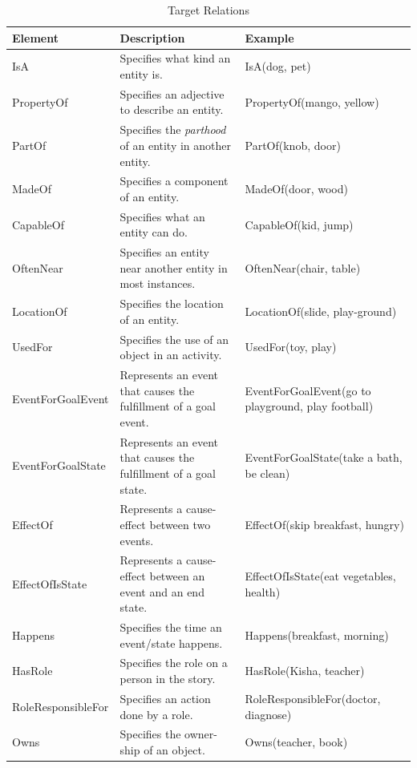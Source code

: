 \begin{table}[H]   %
\centering
\caption{Target Relations} \vspace{0.25em}
\begin{tabular}{|p{3.5cm}|p{4cm}|p{5.5cm}|} \hline
\textbf{Element} & \textbf{Description} & \textbf{Example} \\ \hline
IsA					& Specifies what kind an entity is. & IsA(dog, pet) \\ \hline
PropertyOf			& Specifies an adjective to describe an entity. & PropertyOf(mango, yellow) \\ \hline
PartOf				& Specifies the \textit{parthood} of an entity in another entity. & PartOf(knob, door) \\ \hline
MadeOf				& Specifies a component of an entity. & MadeOf(door, wood) \\ \hline
CapableOf			& Specifies what an entity can do. & CapableOf(kid, jump) \\ \hline
OftenNear			& Specifies an entity near another entity in most instances. & OftenNear(chair, table) \\ \hline
LocationOf			& Specifies the location of an entity. & LocationOf(slide, play-ground) \\ \hline
UsedFor				& Specifies the use of an object in an activity. & UsedFor(toy, play) \\ \hline
EventForGoalEvent	& Represents an event that causes the fulfillment of a goal event. & EventForGoalEvent(go to playground, play football) \\ \hline
EventForGoalState	& Represents an event that causes the fulfillment of a goal state. & EventForGoalState(take a bath, be clean) \\ \hline
EffectOf			& Represents a cause-effect between two events. & EffectOf(skip breakfast, hungry) \\ \hline
EffectOfIsState		& Represents a cause-effect between an event and an end state. & EffectOfIsState(eat vegetables, health) \\ \hline
Happens				& Specifies the time an event/state happens. & Happens(breakfast, morning) \\ \hline
HasRole				& Specifies the role on a person in the story. & HasRole(Kisha, teacher) \\ \hline
RoleResponsibleFor	& Specifies an action done by a role. & RoleResponsibleFor(doctor, diagnose) \\ \hline
Owns				& Specifies the owner-ship of an object. & Owns(teacher, book) \\ \hline
\end{tabular}
\label{tab:targetrel}
\end{table}

